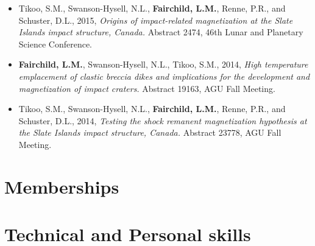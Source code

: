 \documentclass[11pt,a4paper,sans]{moderncv}        %
\begin{document}
\begin{itemize}
\vspace{3pt}

\item{Tikoo, S.M., Swanson-Hysell, N.L., \textbf{Fairchild, L.M.}, Renne, P.R., and Schuster, D.L., 2015, \textit{Origins of impact-related magnetization at the Slate Islands impact structure, Canada.} Abstract 2474, 46th Lunar and Planetary Science Conference.}

\vspace{3pt}

\item{\textbf{Fairchild, L.M.}, Swanson-Hysell, N.L., Tikoo, S.M., 2014, \textit{High temperature emplacement of clastic breccia dikes and implications for the development and magnetization of impact craters.} Abstract 19163, AGU Fall Meeting.}

\vspace{3pt}

\item{Tikoo, S.M., Swanson-Hysell, N.L., \textbf{Fairchild, L.M.}, Renne, P.R., and Schuster, D.L., 2014, \textit{Testing the shock remanent magnetization hypothesis at the Slate Islands impact structure, Canada.} Abstract 23778, AGU Fall Meeting.}

\end{itemize}

\section{Memberships}






\section{Technical and Personal skills}

\vspace{6pt}
\end{document}
